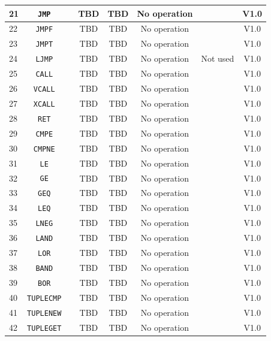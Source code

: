 \documentclass{article}
\begin{document}
\begin{longtable}{|l|c|c|c|c|c|c|c|}
		21 & \texttt{JMP} & & TBD & TBD & No operation & & \textsf{V1.0} \\ \hline
		22 & \texttt{JMPF} & & TBD & TBD & No operation & & \textsf{V1.0} \\ \hline
		23 & \texttt{JMPT} & & TBD & TBD & No operation & & \textsf{V1.0} \\ \hline
		24 & \texttt{LJMP} & & TBD & TBD & No operation & Not used & \textsf{V1.0} \\ \hline
		25 & \texttt{CALL} & & TBD & TBD & No operation & & \textsf{V1.0} \\ \hline
		26 & \texttt{VCALL} & & TBD & TBD & No operation & & \textsf{V1.0} \\ \hline
		27 & \texttt{XCALL} & & TBD & TBD & No operation & & \textsf{V1.0} \\ \hline
		28 & \texttt{RET} & & TBD & TBD & No operation & & \textsf{V1.0} \\ \hline
		29 & \texttt{CMPE} & & TBD & TBD & No operation & & \textsf{V1.0} \\ \hline
		30 & \texttt{CMPNE} & & TBD & TBD & No operation & & \textsf{V1.0} \\ \hline
		31 & \texttt{LE} & & TBD & TBD & No operation & & \textsf{V1.0} \\ \hline
		32 & \texttt{GE} & & TBD & TBD & No operation & & \textsf{V1.0} \\ \hline
		33 & \texttt{GEQ} & & TBD & TBD & No operation & & \textsf{V1.0} \\ \hline
		34 & \texttt{LEQ} & & TBD & TBD & No operation & & \textsf{V1.0} \\ \hline
		35 & \texttt{LNEG} & & TBD & TBD & No operation & & \textsf{V1.0} \\ \hline
		36 & \texttt{LAND} & & TBD & TBD & No operation & & \textsf{V1.0} \\ \hline
		37 & \texttt{LOR} & & TBD & TBD & No operation & & \textsf{V1.0} \\ \hline
		38 & \texttt{BAND} & & TBD & TBD & No operation & & \textsf{V1.0} \\ \hline
		39 & \texttt{BOR} & & TBD & TBD & No operation & & \textsf{V1.0} \\ \hline
		40 & \texttt{TUPLECMP} & & TBD & TBD & No operation & & \textsf{V1.0} \\ \hline
		41 & \texttt{TUPLENEW} & & TBD & TBD & No operation & & \textsf{V1.0} \\ \hline
		42 & \texttt{TUPLEGET} & & TBD & TBD & No operation & & \textsf{V1.0} \\ \hline

\end{longtable}
\end{document}
